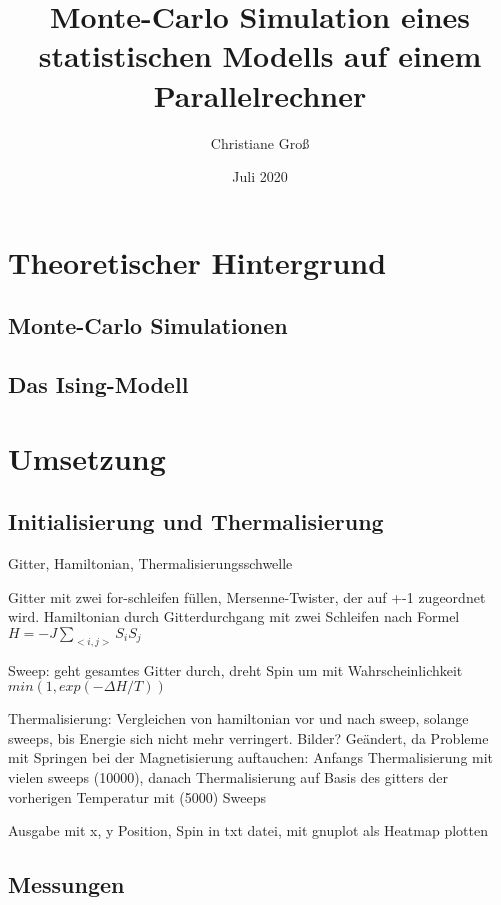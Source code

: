 \documentclass{scrreprt}
\title{Monte-Carlo Simulation eines statistischen Modells auf einem Parallelrechner}
\date{Juli 2020}
\author{Christiane Groß}
\begin{document}
	\maketitle
	
	
	\tableofcontents
	
	\clearpage
	
	\chapter{Theoretischer Hintergrund}
	\section{Monte-Carlo Simulationen}
	\section{Das Ising-Modell}
	\chapter{Umsetzung}
	\section{Initialisierung und Thermalisierung}
	Gitter, Hamiltonian, Thermalisierungsschwelle
	
	Gitter mit zwei for-schleifen füllen, Mersenne-Twister, der auf +-1 zugeordnet wird.
	Hamiltonian durch Gitterdurchgang mit zwei Schleifen nach Formel $H=-J\sum_{<i,j>}S_iS_j$
	
	Sweep: geht gesamtes Gitter durch, dreht Spin um mit Wahrscheinlichkeit $min\left(1, exp(-\Delta H/T)\right) $
	
	Thermalisierung: 
	Vergleichen von hamiltonian vor und nach sweep, solange sweeps, bis Energie sich nicht mehr verringert. Bilder?
	Geändert, da Probleme mit Springen bei der Magnetisierung auftauchen: Anfangs Thermalisierung mit vielen sweeps (10000), danach Thermalisierung auf Basis des gitters der vorherigen Temperatur mit (5000) Sweeps
	
	Ausgabe mit x, y Position, Spin in txt datei, mit gnuplot als Heatmap plotten
	\section{Messungen}
\end{document}
